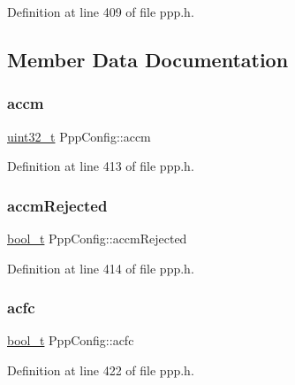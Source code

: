 Definition at line 409 of file ppp.\+h.



\subsection{Member Data Documentation}
\mbox{\label{structPppConfig_a92e4153256daee6e4f282f5d34b49cc0}} 
\subsubsection{\texorpdfstring{accm}{accm}}
{\footnotesize\ttfamily \hyperlink{stdint_8h_a435d1572bf3f880d55459d9805097f62}{uint32\+\_\+t} Ppp\+Config\+::accm}



Definition at line 413 of file ppp.\+h.

\mbox{\label{structPppConfig_a46712771d717f5c45763ff34df2cc431}} 
\subsubsection{\texorpdfstring{accm\+Rejected}{accmRejected}}
{\footnotesize\ttfamily \hyperlink{compiler__port_8h_a812d16e5494522586b3784e55d479912}{bool\+\_\+t} Ppp\+Config\+::accm\+Rejected}



Definition at line 414 of file ppp.\+h.

\mbox{\label{structPppConfig_a78ea406e50d3ce395d25069882da54c5}} 
\subsubsection{\texorpdfstring{acfc}{acfc}}
{\footnotesize\ttfamily \hyperlink{compiler__port_8h_a812d16e5494522586b3784e55d479912}{bool\+\_\+t} Ppp\+Config\+::acfc}



Definition at line 422 of file ppp.\+h.

\mbox{\label{structPppConfig_afa2500aa7a1dd71b77864f9f72d224b7}} 
